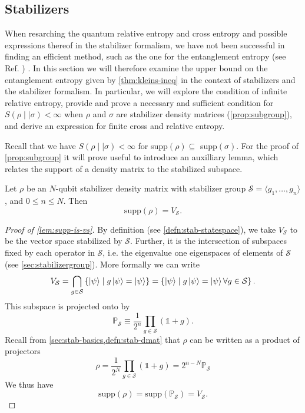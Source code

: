 \subsection{Stabilizers}\label{sec:rel-ent-stab}
When resarching the quantum relative entropy and cross entropy and possible
expressions thereof in the stabilizer formalism, we have not been successful in
finding an efficient method, such as the one for the entanglement entropy
(see Ref. \cite{fattalEntanglementStabilizerFormalism2004})
\cite{veitchResourceTheoryStabilizer2014,niekampEntropicUncertaintyRelations2012,leoneStabilizerEntropiesAre2024,leonePhaseTransitionStabilizer2024,wuEntanglementUpperBound2011,vedralEntanglementMeasuresPurification1998,lindenQuantumEntropyCone2013,buExtremalityStabilizerStates2024,arabLectureNotesQuantum2024,nielsenQuantumComputationQuantum2010}.
In this section we will therefore examine the upper bound on the entanglement entropy
given by \cref{thm:kleins-ineq} in the context of stabilizers and the
stabilizer formalism. In particular, we will explore the condition of infinite
relative entropy,
provide and prove a necessary and sufficient condition
for $S(\rho\mid\mid\sigma)<\infty$ when $\rho$ and $\sigma$ are stabilizer
density matrices (\cref{prop:subgroup}), and derive an expression for finite cross
and relative entropy.

Recall that we have $S(\rho\mid\mid\sigma)<\infty$ for
supp$(\rho)\subseteq$ supp$(\sigma)$. For the proof of \cref{prop:subgroup} it
will prove useful to introduce an auxilliary lemma, which relates the support
of a density matrix to the stabilized subspace.
\begin{lem}\label{lem:supp-is-vs}
  Let $\rho$ be an $N$-qubit stabilizer density matrix with stabilizer group
  $\mathcal{S} = \langle
  g_1, \ldots, g_n \rangle$, and $0\leq n \leq N$.
  Then \[ \mathrm{supp}(\rho) = V_\mathcal{S}.\]
\end{lem}
\begin{proof}[Proof of \cref{lem:supp-is-vs}]
  By definition (see \cref{defn:stab-statespace}), we take $V_\mathcal{S}$ to be the vector space
  stabilized by $\mathcal{S}$.  Further, it is the intersection of subspaces fixed by
  each operator in $\mathcal{S}$, i.e. the eigenvalue one eigenspaces of
  elements of $\mathcal{S}$
  (see \cref{sec:stabilizergroup}). More
  formally we can write
  \[ 
    V_{\mathcal{S}} = \bigcap_{g \in \mathcal{S}}  \left\{\ket{\psi} \mid g\ket{\psi} =
    \ket{\psi}\right\} = \left\{\ket{\psi} \mid g\ket{\psi} =
  \ket{\psi} \forall g \in \mathcal{S}\right\}.
  \]
  This subspace is projected onto by
  \[ \mathbb{P}_{\mathcal{S}} \equiv \frac{1}{2^n} \prod_{g\in \mathcal{S}} \left(\mathds{1} + g\right).\]
  Recall from \cref{sec:stab-basics,defn:stab-dmat} that $\rho$ can be written as a product of
  projectors
  \[ \rho = \frac{1}{2^N} \prod_{g \in \mathcal{S}} \left(\mathds{1} + g\right)
  = 2^{n-N} \mathbb{P}_\mathcal{S} \]
  We thus have
  \[ \mathrm{supp}(\rho) = \mathrm{supp}(\mathbb{P}_{\mathcal{S}}) =
  V_{\mathcal{S}}. \]
\end{proof}

